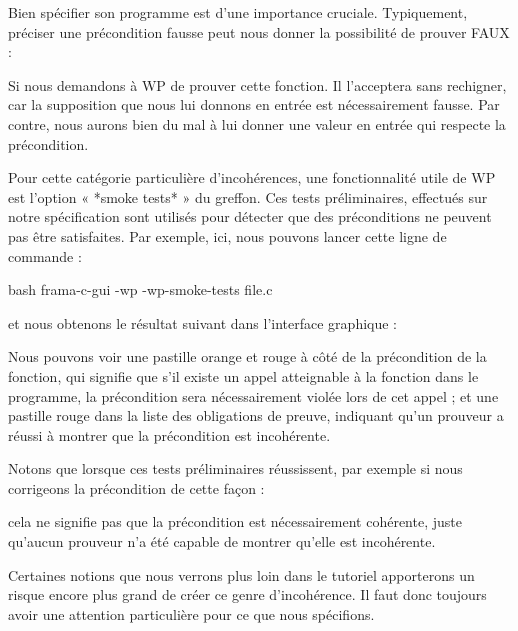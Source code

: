 

Bien spécifier son programme est d'une importance cruciale. Typiquement,
préciser une précondition fausse peut nous donner la possibilité de prouver
FAUX :




Si nous demandons à WP de prouver cette fonction. Il l'acceptera sans rechigner,
car la supposition que nous lui donnons en entrée est nécessairement fausse. Par
contre, nous aurons bien du mal à lui donner une valeur en entrée qui respecte la
précondition.


Pour cette catégorie particulière d'incohérences, une fonctionnalité utile de WP
est l'option « *smoke tests* » du greffon. Ces tests préliminaires, effectués sur
notre spécification sont utilisés pour détecter que des préconditions ne peuvent
pas être satisfaites. Par exemple, ici, nous pouvons lancer cette ligne de
commande :


\begin{CodeBlock}{bash}
  frama-c-gui -wp -wp-smoke-tests file.c
\end{CodeBlock}


et nous obtenons le résultat suivant dans l'interface graphique :




Nous pouvons voir une pastille orange et rouge à côté de la précondition de la
fonction, qui signifie que s'il existe un appel atteignable à la fonction dans
le programme, la précondition sera nécessairement violée lors de cet appel ; et
une pastille rouge dans la liste des obligations de preuve, indiquant qu'un
prouveur a réussi à montrer que la précondition est incohérente.


Notons que lorsque ces tests préliminaires réussissent, par exemple si
nous corrigeons la précondition de cette façon :




cela ne signifie pas que la précondition est nécessairement cohérente, juste
qu'aucun prouveur n'a été capable de montrer qu'elle est incohérente.


Certaines notions que nous verrons plus loin dans le tutoriel apporterons un
risque encore plus grand de créer ce genre d'incohérence. Il faut donc toujours
avoir une attention particulière pour ce que nous spécifions.






